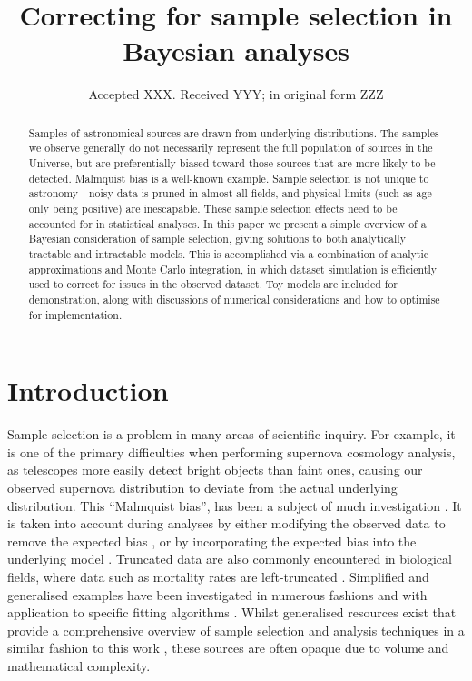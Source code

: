 \documentclass[a4paper,fleqn,usenatbib]{mnras}
\title[Correcting for sample selection in Bayesian analyses]{Correcting for sample selection in Bayesian analyses}
\author[S. R. Hinton et al.]{Samuel R. Hinton,$^{1,2}$\thanks{E-mail: \href{samuelreay@gmail.com}}
	Alex Kim,$^{3}$
	Tamara M. Davis,$^{1,2}$
\\
$^{1}$School of Mathematics and Physics, The University of Queensland, Brisbane, QLD 4072, Australia\\
$^{2}$ARC Centre of Excellence for All-sky Astrophysics (CAASTRO)\\
$^{3}$Physics Division, Lawrence Berkeley National Laboratory, 1 Cyclotron Road, Berkeley, CA 94720,
USA
}
\date{Accepted XXX. Received YYY; in original form ZZZ}
\begin{document}
\label{firstpage}
\pagerange{\pageref{firstpage}--\pageref{lastpage}}
\maketitle





\begin{abstract}
Samples of astronomical sources are drawn from underlying distributions. The samples we observe generally do not necessarily represent the full population of sources in the Universe, but are preferentially biased toward those sources that are more likely to be detected.  Malmquist bias is a well-known example. Sample selection is not unique to astronomy - noisy data is pruned in almost all fields, and physical limits  (such as age only being positive) are inescapable. These sample selection effects need to be accounted for in statistical analyses. In this paper we present a simple overview of a Bayesian consideration of sample selection, giving solutions to both analytically tractable and intractable models. This is accomplished via a combination of analytic approximations and Monte Carlo integration, in which dataset simulation is efficiently used to correct for issues in the observed dataset. Toy models are included for demonstration, along with discussions of numerical considerations and how to optimise for implementation.
\end{abstract}








\section{Introduction}

Sample selection is a problem in many areas of scientific inquiry. For example, it is one of the primary difficulties when performing supernova cosmology analysis, as telescopes more easily detect bright objects than faint ones, causing our observed supernova distribution to deviate from the actual underlying distribution. This  ``Malmquist bias'', has been a subject of much investigation \citep{Butkevich2005}. It is taken into account during analyses by either modifying the observed data to remove the expected bias \citep{BetouleKessler2014, ConleyGuySullivan2011}, or by incorporating the expected bias into the underlying model \citep{Rubin2015}. Truncated data are also commonly encountered in biological fields, where data such as mortality rates are left-truncated \citep{JANE1898}. Simplified and generalised examples have been investigated in numerous fashions \citep{woodroofe1985estimating, Gull1989bayesian, grogger1991models, o1995truncated} and with application to specific fitting algorithms \citep{Gelfand1992}. Whilst generalised resources exist that provide a comprehensive overview of sample selection and analysis techniques in a similar fashion to this work \citep{klein2005survival}, these sources are often opaque due to volume and mathematical complexity. 
\end{document}
